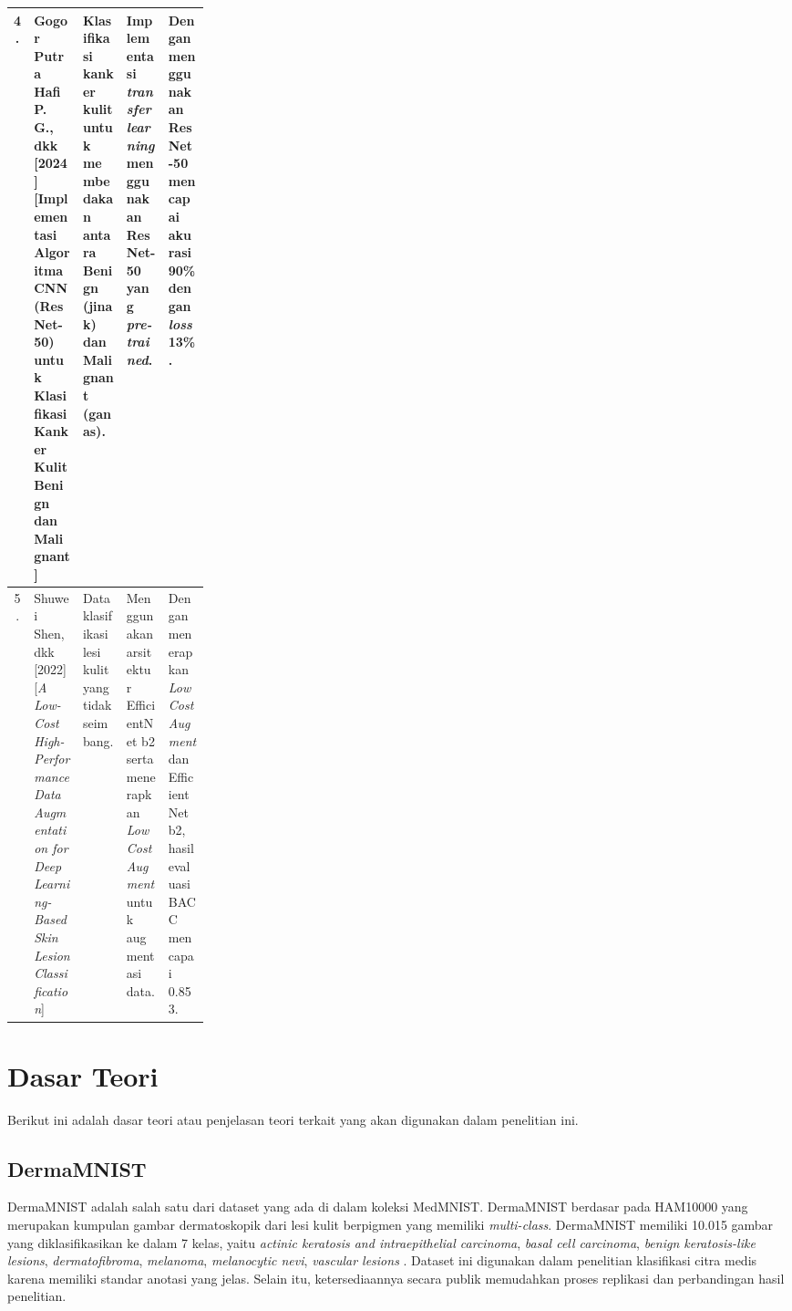 \begin{landscape}
\begin{small}
\begin{tabularx}{\linewidth}{| c | p{0.25\linewidth} | X | X | X |}
    4. & Gogor Putra Hafi P. G., dkk [2024] [Implementasi Algoritma CNN (ResNet-50) untuk Klasifikasi Kanker Kulit Benign dan Malignant] 
       & Klasifikasi kanker kulit untuk membedakan antara Benign (jinak) dan Malignant (ganas). 
       & Implementasi \textit{transfer learning} menggunakan ResNet-50 yang \textit{pre-trained}. 
       & Dengan menggunakan ResNet-50 mencapai akurasi 90\% dengan \textit{loss} 13\%. \\ \hline

    5. & Shuwei Shen, dkk [2022] [\textit{A Low-Cost High-Performance Data Augmentation for Deep Learning-Based Skin Lesion Classification}] 
       & Data klasifikasi lesi kulit yang tidak seimbang. 
       & Menggunakan arsitektur EfficientNet b2 serta menerapkan \textit{Low Cost Augment} untuk augmentasi data. 
       & Dengan menerapkan \textit{Low Cost Augment} dan EfficientNet b2, hasil evaluasi BACC mencapai 0.853. \\ \hline

\end{tabularx}

\end{small}
\end{landscape} %

\section{Dasar Teori} \label{II.Teori}
Berikut ini adalah dasar teori atau penjelasan teori terkait yang akan 
digunakan dalam penelitian ini.

\subsection{DermaMNIST} \label{II.Teori1}
DermaMNIST adalah salah satu dari dataset yang ada di dalam koleksi MedMNIST.
DermaMNIST berdasar pada HAM10000 yang merupakan kumpulan gambar dermatoskopik 
dari lesi kulit berpigmen yang memiliki \textit{multi-class}. DermaMNIST 
memiliki 10.015 gambar yang diklasifikasikan ke dalam 7 kelas, yaitu 
\textit{actinic keratosis and intraepithelial carcinoma},
\textit{basal cell carcinoma}, \textit{benign keratosis-like lesions},
\textit{dermatofibroma}, \textit{melanoma}, \textit{melanocytic nevi},
\textit{vascular lesions} \cite{Yang_2023}. Dataset ini digunakan dalam 
penelitian klasifikasi citra medis karena memiliki standar anotasi yang 
jelas. Selain itu, ketersediaannya secara publik memudahkan proses 
replikasi dan perbandingan hasil penelitian. \par

